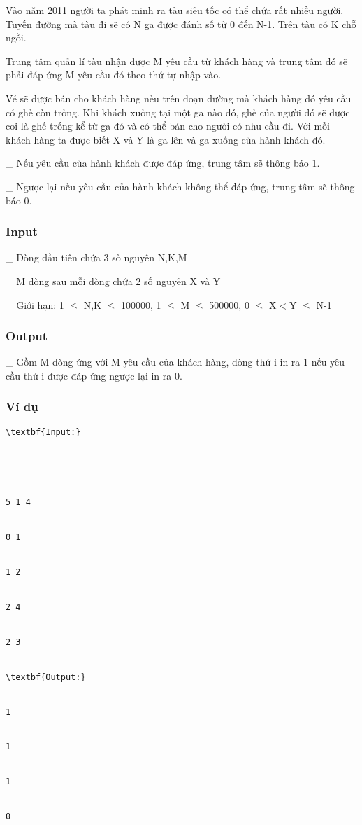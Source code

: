 



   Vào năm 2011 người ta phát minh ra tàu siêu tốc có thể chứa rất nhiều người. Tuyến đường mà tàu đi sẽ có N ga được đánh số từ 0 đến N-1. Trên tàu có K chỗ ngồi.  

   Trung tâm quản lí tàu nhận được M yêu cầu từ khách hàng và trung tâm đó sẽ phải đáp ứng M yêu cầu đó theo thứ tự nhập vào.  

   Vé sẽ được bán cho khách hàng nếu trên đoạn đường mà khách hàng đó yêu cầu có ghế còn trống. Khi khách xuống tại một ga nào đó, ghế của người đó sẽ được coi là ghế trống kể từ ga đó và có thể bán cho người có nhu cầu đi. Với mỗi khách hàng ta được biết X và Y là ga lên và ga xuống của hành khách đó.  

   \_ Nếu yêu cầu của hành khách được đáp ứng, trung tâm sẽ thông báo 1.  

   \_ Ngược lại nếu yêu cầu của hành khách không thể đáp ứng, trung tâm sẽ thông báo 0.  

\subsubsection{   Input  }

   \_ Dòng đầu tiên chứa 3 số nguyên N,K,M  

   \_ M dòng sau mỗi dòng chứa 2 số nguyên X và Y  

   \_ Giới hạn: 1 $\le$ N,K $\le$ 100000, 1 $\le$ M $\le$ 500000, 0 $\le$ X$<$Y $\le$ N-1  

\subsubsection{   Output  }

   \_ Gồm M dòng ứng với M yêu cầu của khách hàng, dòng thứ i in ra 1 nếu yêu cầu thứ i được đáp ứng ngược lại in ra 0.  

\subsubsection{   Ví dụ  }
\begin{verbatim}
\textbf{Input:}





5 1 4


0 1


1 2


2 4


2 3


\textbf{Output:}


1


1


1


0


\end{verbatim}
